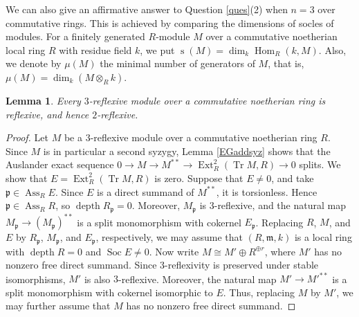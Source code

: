 \documentclass{amsart}
\newtheorem{lem}[thm]{Lemma}
\theoremstyle{definition}
\theoremstyle{remark}
\numberwithin{equation}{thm}
\def\ass{\operatorname{Ass}}
\def\depth{\operatorname{depth}}
\def\Ext{\operatorname{Ext}}
\def\Hom{\operatorname{Hom}}
\def\m{\mathfrak{m}}
\def\p{\mathfrak{p}}
\def\Soc{\operatorname{Soc}}
\def\tr{\operatorname{Tr}}
\begin{document}
We can also give an affirmative answer to Question \ref{ques}(2) when $n=3$ over commutative rings.
This is achieved by comparing the dimensions of socles of modules.
For a finitely generated $R$-module $M$ over a commutative noetherian local ring $R$ with residue field $k$, we put $\operatorname{s}(M)=\dim_k\Hom_R(k,M)$.
Also, we denote by $\mu(M)$ the minimal number of generators of $M$, that is, $\mu(M)=\dim_k(M\otimes_R k)$.

\begin{lem}\label{3refref}
Every $3$-reflexive module over a commutative noetherian ring is reflexive, and hence $2$-reflexive.
\end{lem}

\begin{proof}
Let $M$ be a $3$-reflexive module over a commutative noetherian ring $R$.
Since $M$ is in particular a second syzygy, Lemma \ref{EGaddsyz} shows that the Auslander exact sequence $0\to M\to M^{\ast\ast}\to\Ext^2_R(\tr M,R)\to0$ splits.
We show that $E=\Ext^2_R(\tr M,R)$ is zero.
Suppose that $E\ne0$, and take $\p\in\ass_R E$.
Since $E$ is a direct summand of $M^{\ast\ast}$, it is torsionless. Hence $\p\in\ass_R R$, so $\depth R_\p=0$.
Moreover, $M_\p$ is $3$-reflexive, and the natural map $M_\p\to(M_\p)^{\ast\ast}$ is a split monomorphism with cokernel $E_\p$. Replacing $R$, $M$, and $E$ by $R_\p$, $M_\p$, and $E_\p$, respectively, we may assume that $(R,\m,k)$ is a local ring with $\depth R=0$ and $\Soc E\ne0$.
Now write $M\cong M'\oplus R^{\oplus r}$, where $M'$ has no nonzero free direct summand. Since $3$-reflexivity is preserved under stable isomorphisms, $M'$ is also $3$-reflexive. Moreover, the natural map $M'\to M'^{\ast\ast}$ is a split monomorphism with cokernel isomorphic to $E$. Thus, replacing $M$ by $M'$, we may further assume that $M$ has no nonzero free direct summand.


\end{proof}
\end{document}

